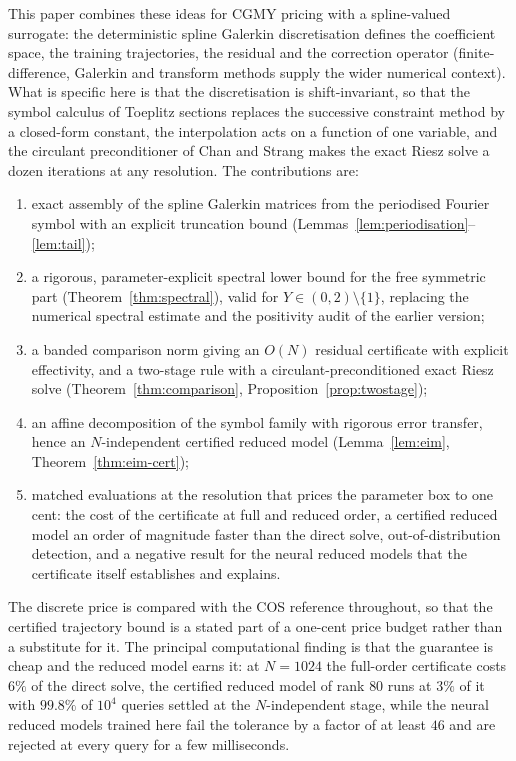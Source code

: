 \documentclass[hidelinks]{siamart251216}
\begin{document}
This paper combines these ideas for CGMY pricing with a spline-valued surrogate: the deterministic
spline Galerkin discretisation \cite{DamircheliCGMY2026} defines the coefficient space, the training
trajectories, the residual and the correction operator (finite-difference, Galerkin and transform
methods \cite{ContVoltchkova2005,MatacheVonPetersdorffSchwab2004,HilberReichmannSchwabWinter2013,FangOosterlee2008}
supply the wider numerical context).  What is specific here is that the discretisation is
shift-invariant, so that the symbol calculus of Toeplitz sections
\cite{GrenanderSzego1958,BottcherSilbermann1999} replaces the successive constraint method by a
closed-form constant, the interpolation acts on a function of one variable, and the circulant
preconditioner of Chan and Strang \cite{ChanStrang1989} makes the exact Riesz solve a dozen
iterations at any resolution.  The contributions are:
\begin{enumerate}[leftmargin=2em]
\item exact assembly of the spline Galerkin matrices from the periodised
Fourier symbol with an explicit truncation bound (Lemmas~\ref{lem:periodisation}--\ref{lem:tail});
\item a rigorous, parameter-explicit spectral lower bound for the free symmetric part
(Theorem~\ref{thm:spectral}), valid for $Y\in(0,2)\setminus\{1\}$, replacing the
numerical spectral estimate and the positivity audit of the earlier version;
\item a banded comparison norm giving an $O(N)$ residual certificate with explicit effectivity,
and a two-stage rule with a circulant-preconditioned exact Riesz solve
(Theorem~\ref{thm:comparison}, Proposition~\ref{prop:twostage});
\item an affine decomposition of the symbol family with rigorous error transfer, hence an
$N$-independent certified reduced model (Lemma~\ref{lem:eim}, Theorem~\ref{thm:eim-cert});
\item matched evaluations at the resolution that prices the parameter box to one cent: the cost
of the certificate at full and reduced order, a certified reduced model an order of magnitude
faster than the direct solve, out-of-distribution detection, and a negative result for the neural
reduced models that the certificate itself establishes and explains.
\end{enumerate}
The discrete price is compared with the COS reference \cite{FangOosterlee2008} throughout, so that
the certified trajectory bound is a stated part of a one-cent price budget rather than a substitute
for it.  The principal computational finding is that the guarantee is cheap and the reduced model
earns it: at $N=1024$ the full-order certificate costs $6\%$ of the direct solve, the certified
reduced model of rank $80$ runs at $3\%$ of it with $99.8\%$ of $10^4$ queries settled at the
$N$-independent stage, while the neural reduced models trained here fail the tolerance by a
factor of at least $46$ and are rejected at every query for a few milliseconds.
\end{document}

